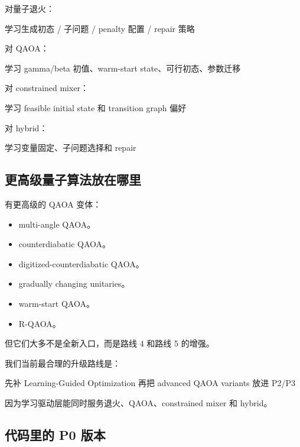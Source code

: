 \documentclass[UTF8,12pt,a4paper]{ctexart}
\begin{document}
对量子退火：

\begin{GuideVerbatim}
学习生成初态 / 子问题 / penalty 配置 / repair 策略
\end{GuideVerbatim}

对 QAOA：

\begin{GuideVerbatim}
学习 gamma/beta 初值、warm-start state、可行初态、参数迁移
\end{GuideVerbatim}

对 constrained mixer：

\begin{GuideVerbatim}
学习 feasible initial state 和 transition graph 偏好
\end{GuideVerbatim}

对 hybrid：

\begin{GuideVerbatim}
学习变量固定、子问题选择和 repair
\end{GuideVerbatim}

\subsection*{更高级量子算法放在哪里}

有更高级的 QAOA 变体：

\begin{itemize}
\item multi-angle QAOA。
\item counterdiabatic QAOA。
\item digitized-counterdiabatic QAOA。
\item gradually changing unitaries。
\item warm-start QAOA。
\item R-QAOA。
\end{itemize}

但它们大多不是全新入口，而是路线 4 和路线 5 的增强。

我们当前最合理的升级路线是：

\begin{GuideVerbatim}
先补 Learning-Guided Optimization
再把 advanced QAOA variants 放进 P2/P3
\end{GuideVerbatim}

因为学习驱动层能同时服务退火、QAOA、constrained mixer 和 hybrid。

\subsection*{代码里的 P0 版本}
\end{document}
